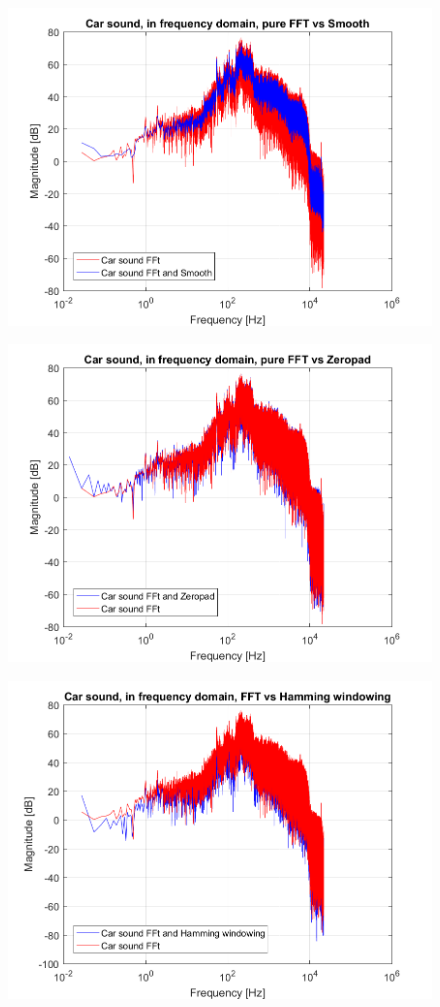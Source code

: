 \begin{figure}
	\centering
	\includegraphics[width=\textwidth]{code/Car_figure3.png}
	\caption{}
	\label{fig:Car_figure3:2}
\end{figure}



\begin{figure}
	\centering
	\includegraphics[width=\textwidth]{code/Car_figure4.png}
	\caption{}
	\label{fig:Car_figure4:2}
\end{figure}


\begin{figure}
	\centering
	\includegraphics[width=\textwidth]{code/Car_figure5.png}
	\caption{}
	\label{fig:Car_figure5:2}
\end{figure}